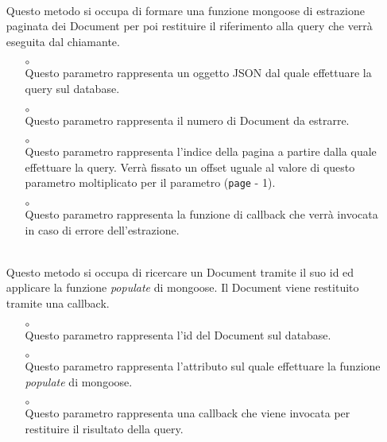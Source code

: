 \begin{itemize}
\item[]  \\ Questo metodo si occupa di formare una funzione mongoose di estrazione paginata dei Document per poi restituire il riferimento alla query che verrà eseguita dal chiamante. 
\begin{itemize}\addtolength{\itemsep}{-0.5\baselineskip}
\item[$\circ$]  \\ Questo parametro rappresenta un oggetto JSON dal quale effettuare la query sul database.
\item[$\circ$]  \\ Questo parametro rappresenta il numero di Document da estrarre.
\item[$\circ$]  \\ Questo parametro rappresenta l'indice della pagina a partire dalla quale effettuare la query. Verrà fissato un offset uguale al valore di questo parametro moltiplicato per il parametro (\texttt{page} - 1).
\item[$\circ$]  \\ Questo parametro rappresenta la funzione di callback che verrà invocata in caso di errore dell'estrazione.
\end{itemize}
\item[]  \\ Questo metodo si occupa di ricercare un Document tramite il suo id ed applicare la funzione \textit{populate} di mongoose. Il Document viene restituito tramite una callback.
\begin{itemize}\addtolength{\itemsep}{-0.5\baselineskip}
\item[$\circ$]  \\ Questo parametro rappresenta l'id del Document sul database.
\item[$\circ$]  \\ Questo parametro rappresenta l'attributo sul quale effettuare la funzione \textit{populate} di mongoose.
\item[$\circ$]  \\ Questo parametro rappresenta una callback che viene invocata per restituire il risultato della query.

\end{itemize}
\end{itemize}

